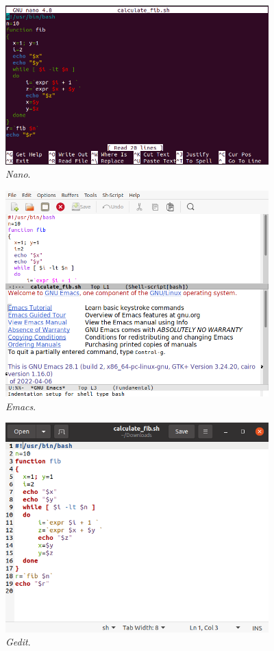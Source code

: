 \begin{figure}
	\centering
	\includegraphics[width=4in]{chapters/ch_text_file_editing/figures/nano_fib.png}
	\caption{\textit{Nano}.}
\end{figure}

\begin{figure}
	\centering
	\includegraphics[width=4in]{chapters/ch_text_file_editing/figures/emacs_fib.png}
	\caption{\textit{Emacs}.}
\end{figure}

\begin{figure}
	\centering
	\includegraphics[width=4in]{chapters/ch_text_file_editing/figures/gedit_fib.png}
	\caption{\textit{Gedit}.}
\end{figure}

